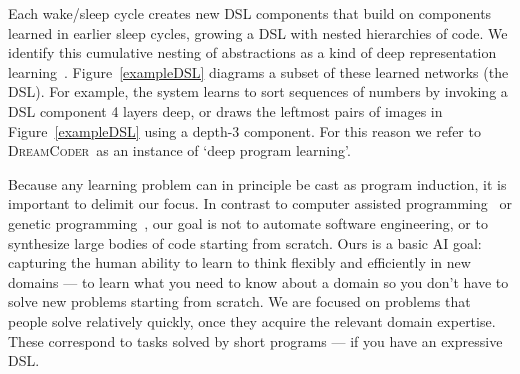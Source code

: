 \documentclass{article}
\newcommand{\system}{\textsc{DreamCoder}~}
\begin{document}

Each wake/sleep cycle creates new DSL components that build on
components learned in earlier sleep cycles, growing a DSL with nested 
hierarchies of code.  We identify this cumulative nesting of
abstractions as a kind of deep representation
learning~\cite{lecun2015deep}.  Figure~\ref{exampleDSL} diagrams a
subset of these learned networks (the DSL). For example, the system
learns to sort sequences of numbers by invoking a DSL component 4
layers deep, or draws the leftmost pairs of images in
Figure~\ref{exampleDSL} using a depth-3 component.  For this reason we
refer to \system as an instance of `deep program learning'.


Because any learning problem can in principle be cast as program
induction, it is important to delimit our focus.  In contrast to
computer assisted programming~\cite{solar2008program} or genetic
programming~\cite{DBLP:books/daglib/0070933}, our goal is not to
automate software engineering, or to synthesize large bodies of code
starting from scratch.  Ours is a basic AI goal: capturing the human
ability to learn to think flexibly and efficiently in new domains ---
to learn what you need to know about a domain so you don't have to
solve new problems starting from scratch.  We are focused on problems
that people solve relatively quickly, once they acquire the relevant
domain expertise.  These correspond to tasks solved by short programs
--- if you have an expressive DSL.
\end{document}
